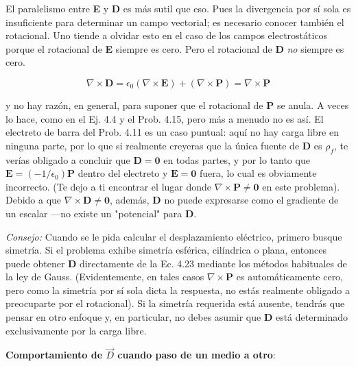 \documentclass[12pt,a4paper]{report}
\newcommand{\esp}{\vspace{0.5cm}}
\begin{document}
	\esp
	
	El paralelismo entre \textbf{E} y \textbf{D} es más sutil que eso. Pues la divergencia por sí sola es insuficiente para determinar un campo vectorial; es necesario conocer también el rotacional. Uno tiende a olvidar esto en el caso de los campos electrostáticos porque el rotacional de \textbf{E} siempre es cero. Pero el rotacional de \textbf{D} \textit{no} siempre es cero.
	
	\esp
	
	\begin{equation}
		\nabla \times \mathbf{D} = \epsilon_0(\nabla \times \mathbf{E}) + (\nabla \times \mathbf{P}) = \nabla \times \mathbf{P}
	\end{equation}
	
	\esp
	
	y no hay razón, en general, para suponer que el rotacional de \textbf{P} se anula. A veces lo hace, como en el Ej. 4.4 y el Prob. 4.15, pero más a menudo no es así. El electreto de barra del Prob. 4.11 es un caso puntual: aquí no hay carga libre en ninguna parte, por lo que si realmente creyeras que la única fuente de \textbf{D} es $\rho_f$, te verías obligado a concluir que $\mathbf{D} = \mathbf{0}$ en todas partes, y por lo tanto que $\mathbf{E} = (-1/\epsilon_0)\mathbf{P}$ dentro del electreto y $\mathbf{E} = \mathbf{0}$ fuera, lo cual es obviamente incorrecto. (Te dejo a ti encontrar el lugar donde $\nabla \times \mathbf{P} \neq \mathbf{0}$ en este problema). Debido a que $\nabla \times \mathbf{D} \neq \mathbf{0}$, además, \textbf{D} no puede expresarse como el gradiente de un escalar —no existe un "potencial" para \textbf{D}.
	
	\esp
	
	\textit{Consejo:} Cuando se le pida calcular el desplazamiento eléctrico, primero busque simetría. Si el problema exhibe simetría esférica, cilíndrica o plana, entonces puede obtener \textbf{D} directamente de la Ec. 4.23 mediante los métodos habituales de la ley de Gauss. (Evidentemente, en tales casos $\nabla \times \mathbf{P}$ es automáticamente cero, pero como la simetría por sí sola dicta la respuesta, no estás realmente obligado a preocuparte por el rotacional). Si la simetría requerida está ausente, tendrás que pensar en otro enfoque y, en particular, no debes asumir que \textbf{D} está determinado exclusivamente por la carga libre.
	
	\esp
	
	\noindent \textbf{Comportamiento de $\vec{D}$ cuando paso de un medio a otro}:
	
\end{document}
